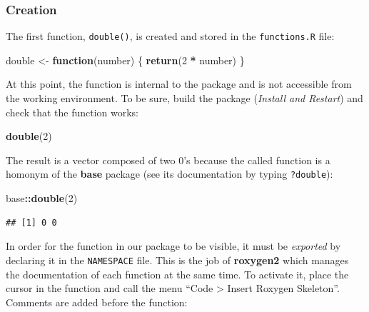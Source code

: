 \documentclass[
  12pt,
  american,
  a4paper,
  extrafontsizes,onecolumn,openright
  ]{memoir}
\newenvironment{Shaded}{\begin{snugshade}}{\end{snugshade}}
\newcommand{\ControlFlowTok}[1]{\textcolor[rgb]{0.13,0.29,0.53}{\textbf{#1}}}
\newcommand{\DecValTok}[1]{\textcolor[rgb]{0.00,0.00,0.81}{#1}}
\newcommand{\FunctionTok}[1]{\textcolor[rgb]{0.13,0.29,0.53}{\textbf{#1}}}
\newcommand{\NormalTok}[1]{#1}
\newcommand{\OtherTok}[1]{\textcolor[rgb]{0.56,0.35,0.01}{#1}}
\newcommand{\SpecialCharTok}[1]{\textcolor[rgb]{0.81,0.36,0.00}{\textbf{#1}}}
\begin{document}
\subsubsection{Creation}\label{creation-1}

The first function, \texttt{double()}, is created and stored in the \texttt{functions.R} file:

\scriptsize

\begin{Shaded}
\begin{Highlighting}[]
\NormalTok{double }\OtherTok{\textless{}{-}} \ControlFlowTok{function}\NormalTok{(number) \{}
    \FunctionTok{return}\NormalTok{(}\DecValTok{2} \SpecialCharTok{*}\NormalTok{ number)}
\NormalTok{\}}
\end{Highlighting}
\end{Shaded}

\normalsize

At this point, the function is internal to the package and is not accessible from the working environment.
To be sure, build the package (\emph{Install and Restart}) and check that the function works:

\scriptsize

\begin{Shaded}
\begin{Highlighting}[]
\FunctionTok{double}\NormalTok{(}\DecValTok{2}\NormalTok{)}
\end{Highlighting}
\end{Shaded}

\normalsize

The result is a vector composed of two 0's because the called function is a homonym of the \textbf{base} package (see its documentation by typing \texttt{?double}):

\scriptsize

\begin{Shaded}
\begin{Highlighting}[]
\NormalTok{base}\SpecialCharTok{::}\FunctionTok{double}\NormalTok{(}\DecValTok{2}\NormalTok{)}
\end{Highlighting}
\end{Shaded}

\begin{verbatim}
## [1] 0 0
\end{verbatim}

\normalsize

In order for the function in our package to be visible, it must be \emph{exported} by declaring it in the \texttt{NAMESPACE} file.
This is the job of \textbf{roxygen2} which manages the documentation of each function at the same time.
To activate it, place the cursor in the function and call the menu \enquote{Code \textgreater{} Insert Roxygen Skeleton}.
Comments are added before the function:
\end{document}
